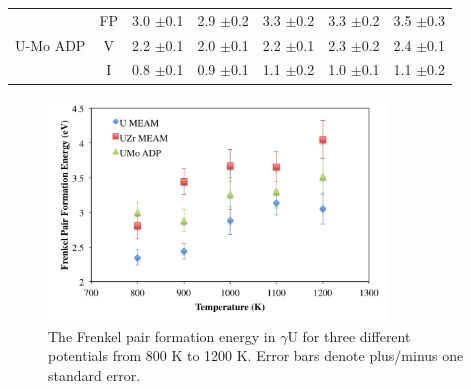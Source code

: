 \documentclass[review]{elsarticle}
\providecommand{\DIFaddtex}[1]{{\protect\color{blue} \sf #1}} %
\providecommand{\DIFaddFL}[1]{\DIFadd{#1}} %
\providecommand{\DIFaddbeginFL}{} %
\providecommand{\DIFaddendFL}{} %
\providecommand{\DIFadd}[1]{\texorpdfstring{\DIFaddtex{#1}}{#1}} %
\newcommand{\DIFaddincludegraphics}[2][]{{\color{blue}\fbox{\DIFOincludegraphics[#1]{#2}}}} %
\DeclareRobustCommand{\DIFaddbeginFL}{\DIFOaddbeginFL \let\includegraphics\DIFaddincludegraphics} %
\DeclareRobustCommand{\DIFaddendFL}{\DIFOaddendFL \let\includegraphics\DIFOincludegraphics} %
\begin{document}
\begin{table}[h]
\begin{center}
\begin{tabular}{|c|c|c|c|c|c|c|}
	 \hline
	 		& FP	& 3.0 \DIFaddbeginFL \DIFaddFL{$\pm$0.1 }\DIFaddendFL & 2.9 \DIFaddbeginFL \DIFaddFL{$\pm$0.2 }\DIFaddendFL & 3.3 \DIFaddbeginFL \DIFaddFL{$\pm$0.2 }\DIFaddendFL & 3.3 \DIFaddbeginFL \DIFaddFL{$\pm$0.2 }\DIFaddendFL & 3.5 \DIFaddbeginFL \DIFaddFL{$\pm$0.3 }\DIFaddendFL \\
	 U-Mo ADP & V	& 2.2 \DIFaddbeginFL \DIFaddFL{$\pm$0.1 }\DIFaddendFL & 2.0 \DIFaddbeginFL \DIFaddFL{$\pm$0.1 }\DIFaddendFL & 2.2 \DIFaddbeginFL \DIFaddFL{$\pm$0.1 }\DIFaddendFL & 2.3 \DIFaddbeginFL \DIFaddFL{$\pm$0.2 }\DIFaddendFL & 2.4 \DIFaddbeginFL \DIFaddFL{$\pm$0.1 }\DIFaddendFL \\
	 		& I	& 0.8 \DIFaddbeginFL \DIFaddFL{$\pm$0.1 }\DIFaddendFL & 0.9 \DIFaddbeginFL \DIFaddFL{$\pm$0.1 }\DIFaddendFL & 1.1 \DIFaddbeginFL \DIFaddFL{$\pm$0.2 }\DIFaddendFL & 1.0 \DIFaddbeginFL \DIFaddFL{$\pm$0.1 }\DIFaddendFL & 1.1 \DIFaddbeginFL \DIFaddFL{$\pm$0.2 }\DIFaddendFL \\
	 \hline
\end{tabular}
\end{center}
\label{default}
\end{table}

\begin{figure}[h]
 \centering
 \includegraphics[width=0.8\textwidth]{frenkel_eform.png} 
 \caption{The Frenkel pair formation energy in $\gamma$U for three different potentials from 800 K to 1200 K. Error bars denote plus/minus one standard error.}
 \label{fig:eform}
\end{figure}

\FloatBarrier
\end{document}
